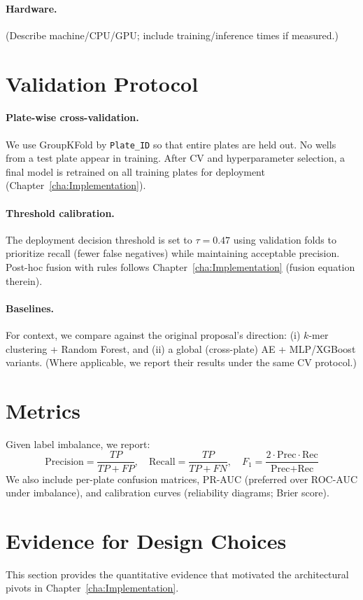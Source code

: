 \paragraph{Hardware.}
(Describe machine/CPU/GPU; include training/inference times if measured.)

\section{Validation Protocol}
\label{sec:protocol}
\paragraph{Plate-wise cross-validation.}
We use GroupKFold by \texttt{Plate\_ID} so that entire plates are held out. No wells from a test plate appear in training. After CV and hyperparameter selection, a final model is retrained on all training plates for deployment (Chapter~\ref{cha:Implementation}).

\paragraph{Threshold calibration.}
The deployment decision threshold is set to $\tau = 0.47$ using validation folds to prioritize recall (fewer false negatives) while maintaining acceptable precision. Post-hoc fusion with rules follows Chapter~\ref{cha:Implementation} (fusion equation therein).

\paragraph{Baselines.}
For context, we compare against the original proposal’s direction:
(i) $k$-mer clustering + Random Forest, and
(ii) a global (cross-plate) AE + MLP/XGBoost variants.
(Where applicable, we report their results under the same CV protocol.)

\section{Metrics}
\label{sec:metrics}
Given label imbalance, we report:
\[
\text{Precision}=\frac{TP}{TP+FP},\quad
\text{Recall}=\frac{TP}{TP+FN},\quad
F_1=\frac{2\cdot \text{Prec}\cdot \text{Rec}}{\text{Prec}+\text{Rec}}
\]
We also include per-plate confusion matrices, PR-AUC (preferred over ROC-AUC under imbalance), and calibration curves (reliability diagrams; Brier score).

\section{Evidence for Design Choices}
\label{sec:evidence_design}
This section provides the quantitative evidence that motivated the architectural pivots in Chapter~\ref{cha:Implementation}.

